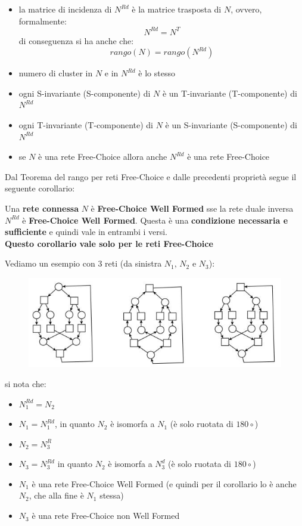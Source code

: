 \documentclass[a4paper,12pt, oneside]{book}
\begin{document}
\begin{itemize}
  \item la matrice di incidenza di $N^{Rd}$ è la matrice trasposta di $N$,
  ovvero, formalmente:
  \[N^{Rd} = N^T \]
  di conseguenza si ha anche che:
  \[rango(N) = rango(N^{Rd})\]
  \item numero di cluster in $N$ e in $N^{Rd}$ è lo stesso
  \item ogni S-invariante (S-componente) di $N$ è un T-invariante (T-componente)
  di $N^{Rd}$
  \item ogni T-invariante (T-componente) di $N$ è un S-invariante (S-componente)
  di $N^{Rd}$
  \item se $N$ è una rete Free-Choice allora anche $N^{Rd}$ è una rete
  Free-Choice 
\end{itemize}
Dal Teorema del rango per reti Free-Choice e dalle precedenti proprietà segue il
seguente corollario:
\begin{corollario}
  Una\textbf{ rete connessa} $N$ è \textbf{Free-Choice Well Formed} sse la rete
  duale inversa $N^{Rd}$ è\textbf{ Free-Choice Well Formed}. Questa è una
  \textbf{condizione necessaria e sufficiente} e quindi vale in entrambi i
  versi.\\
  \textbf{Questo corollario vale solo per le reti Free-Choice}
\end{corollario}
\begin{esempio}
  Vediamo un esempio con 3 reti (da sinistra $N_1,\,N_2\mbox{ e }N_3$):
  \begin{figure}[H]
    \centering
    \includegraphics[scale = 0.65]{img/rd2.jpg}
  \end{figure}
  si nota che:
  \begin{itemize}
    \item $N_1^{Rd}=N_2$
    \item $N_1=N_1^{Rd}$, in quanto $N_2$ è isomorfa a $N_1$ (è solo ruotata di
    $180\circ$) 
    \item $N_2=N_3^R$
    \item $N_3=N_3^{Rd}$ in quanto $N_2$ è isomorfa a $N_3^d$ (è solo ruotata di
    $180\circ$) 
    \item $N_1$ è una rete Free-Choice Well Formed (e quindi per il corollario
    lo è anche $N_2$, che alla fine è $N_1$ stessa)
    \item $N_3$ è una rete Free-Choice non Well Formed
  \end{itemize}
\end{esempio}
\end{document}
